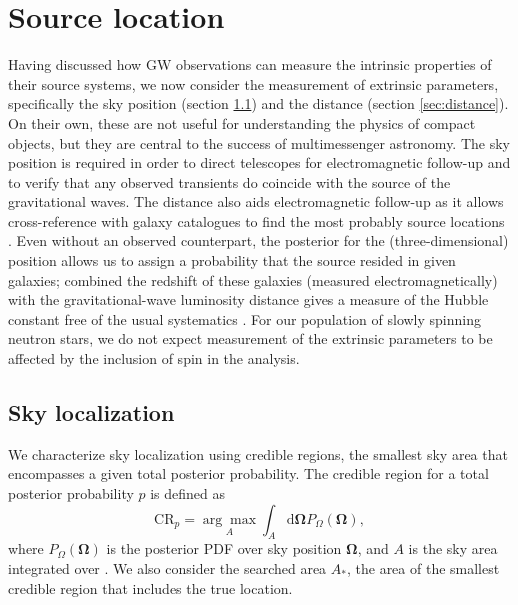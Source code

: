 \section{Source location}

Having discussed how GW observations can measure the intrinsic properties of their source systems, we now consider the measurement of extrinsic parameters, specifically the sky position (section \ref{sec:sky}) and the distance (section \ref{sec:distance}). On their own, these are not useful for understanding the physics of compact objects, but they are central to the success of multimessenger astronomy. The sky position is required in order to direct telescopes for electromagnetic follow-up and to verify that any observed transients do coincide with the source of the gravitational waves. The distance also aids electromagnetic follow-up as it allows cross-reference with galaxy catalogues to find the most probably source locations \citep{Nissanke_2012,Fan_2014}. Even without an observed counterpart, the posterior for the (three-dimensional) position allows us to assign a probability that the source resided in given galaxies; combined the redshift of these galaxies (measured electromagnetically) with the gravitational-wave luminosity distance gives a measure of the Hubble constant free of the usual systematics \citep{Schutz_1986,Del_Pozzo_2012}. For our population of slowly spinning neutron stars, we do not expect measurement of the extrinsic parameters to be affected by the inclusion of spin in the analysis.

\subsection{Sky localization}\label{sec:sky}

We characterize sky localization using credible regions, the smallest sky area that encompasses a given total posterior probability. The credible region for a total posterior probability $p$ is defined as
\begin{equation}
\mathrm{CR}_p = \underset{A}{\arg\!\max} \int_A \mathrm{d}\boldsymbol{\Omega} P_{\Omega}(\boldsymbol{\Omega}),
\label{eq:CR}
\end{equation}
where $P_{\Omega}(\boldsymbol{\Omega})$ is the posterior PDF over sky position $\boldsymbol{\Omega}$, and $A$ is the sky area integrated over \citep{Sidery_2014}. We also consider the searched area $A_\ast$, the area of the smallest credible region that includes the true location.

